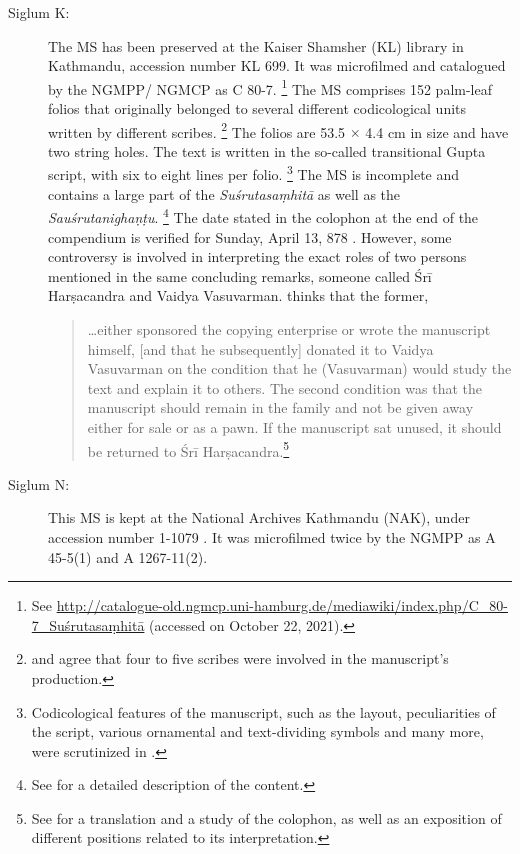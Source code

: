 \begin{description}
\item[Siglum K:] The MS has been preserved at the Kaiser Shamsher (KL) library in Kathmandu, accession number KL 699. It was microfilmed and catalogued by the NGMPP/ NGMCP as C 80-7.%
    \footnote{%
    See 
    \url{http://catalogue-old.ngmcp.uni-hamburg.de/mediawiki/index.php/C_80-7_Suśrutasaṃhitā}
     (accessed on October 22, 2021).%
    } 
The MS comprises 152 palm-leaf folios that originally belonged to several different codicological units written by different scribes.%
    \footnote{%
    \textcites[46]{bhat-2020} and \textcites[11]{kleb-2021b} agree that four to five scribes were involved in the manuscript's production.
    } 
The folios are 53.5 $\times$ 4.4 cm in size and have two string holes.  The text is written in the so-called transitional Gupta script, with six to eight lines per folio.%
    \footnote{%
    Codicological features of the manuscript, such as the layout, peculiarities of the script, various ornamental and text-dividing symbols and many more, were scrutinized in \textcites{bhat-2020}.
    }
The MS is incomplete and contains a large part of the \emph{Suśrutasaṃhitā} as well as the \emph{Sauśrutanighaṇṭu}.%
    \footnote{%
    See \textcites[11]{kleb-2021b} for a detailed description of the content.%
    }
The date stated in the colophon at the end of the compendium is verified for Sunday, April 13, 
878 \CE. However, some controversy is involved in interpreting the exact roles of two 
persons 
mentioned in the same concluding remarks, someone called Śrī Harṣacandra and Vaidya 
Vasuvarman. \textcites[16]{kleb-2021b} thinks that the former,
\begin{quote}
\ldots either sponsored the copying enterprise or wrote the manuscript himself,
[and that he subsequently]
    donated it to Vaidya Vasuvarman on the condition that he (Vasuvarman)
would study the text and explain it to others. The second condition was that
the manuscript should remain in the family and not be given away either for
sale or as a pawn. If the manuscript sat unused, it should be returned to Śrī
Harṣacandra.\footnote{See \textcites[13--17]{kleb-2021b} for a translation and
    a study of the colophon, as well as an exposition of different positions
    related to its interpretation.}
\end{quote}
\item[Siglum N:] This MS is kept at the National Archives Kathmandu (NAK), under accession number 1-1079 . It was microfilmed twice by the NGMPP as A 45-5(1) and A 1267-11(2).%

\end{description}
